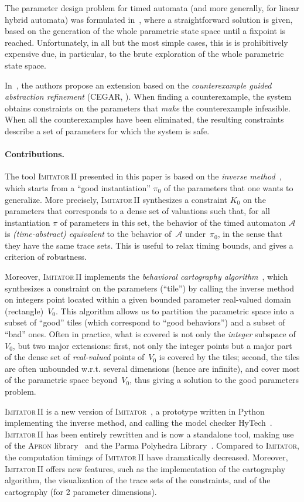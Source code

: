 \documentclass[submission,copyright,creativecommons]{eptcs}
\newcommand{\A}{\mathcal{A}}
\newcommand{\apron}{\textsc{Apron}}
\newcommand{\hytech}{{\sc HyTech}}
\newcommand{\imitator}{\textsc{Imitator}}
\newcommand{\imitatordeux}{\textsc{Imitator}\,II}
\newcommand{\python}{Python}
\newcommand{\paragraphe}[1]{\paragraph{#1.}}
\begin{document}
The parameter design problem for timed automata (and more generally, for linear hybrid automata)
was formulated in~\cite{hw96}, where a straightforward solution is given,
based on the generation of the whole parametric state space until a fixpoint is reached.
Unfortunately, in all but the most simple cases, this is is prohibitively expensive due, in particular, to the brute exploration of the whole parametric state space.

In~\cite{fjk08}, the authors propose an extension based on the {\em counterexample guided abstraction refinement} (CEGAR, \cite{cgjlv00}).
When finding a counterexample, the system obtains constraints on the parameters that {\em make} the counterexample infeasible.
When all the counterexamples have been eliminated, the resulting constraints describe a set of parameters for which the system is safe.



\paragraphe{Contributions}
The tool \imitatordeux{} presented in this paper is based on the {\em inverse method}~\cite{acef09}, which starts from a ``good instantiation'' $\pi_0$ of the parameters that one wants to generalize.
More precisely, \imitatordeux{} synthesizes a constraint $K_0$ on the parameters that corresponds to a dense set of valuations such that, for all instantiation $\pi$ of parameters in this set, the behavior of the timed automaton $\A$ is {\em (time-abstract) equivalent} to the behavior of~$\A$ under~$\pi_0$, in the sense that they have the same trace sets.
This is useful to relax timing bounds, and gives a criterion of robustness.

Moreover, \imitatordeux{} implements the \emph{behavioral cartography algorithm}~\cite{af10}, which synthesizes a constraint on the parameters (``tile'') by calling the inverse method on integers point located within a given bounded parameter real-valued domain (rectangle)~$V_0$.
This algorithm allows us to partition the parametric space into a subset of ``good'' tiles (which correspond to ``good behaviors'') and a subset of ``bad'' ones.
Often in practice, what is covered is not only the {\em integer} subspace of~$V_0$, but two major extensions:
first, not only the integer points but a major part of the dense set of {\em real-valued} points of~$V_0$ is covered by the tiles;
second, the tiles are often unbounded w.r.t. several dimensions (hence are infinite), and cover most of the parametric space beyond~$V_0$, thus giving a solution to the good parameters problem.

\imitatordeux{} is a new version of \imitator{}~\cite{and09}, a prototype written in \python{}~\cite{python-web} implementing the inverse method, and calling the model checker \hytech{}~\cite{hhw97}.
\imitatordeux{} has been entirely rewritten and is now a standalone tool, making use of the \apron{} library~\cite{jm09} and the Parma Polyhedra Library~\cite{bhz08}.
Compared to \imitator{}, the computation timings of \imitatordeux{} have dramatically decreased.
Moreover, \imitatordeux{} offers new features, such as the implementation of the cartography algorithm, the visualization of the trace sets of the constraints, and of the cartography (for 2 parameter dimensions).
\end{document}
